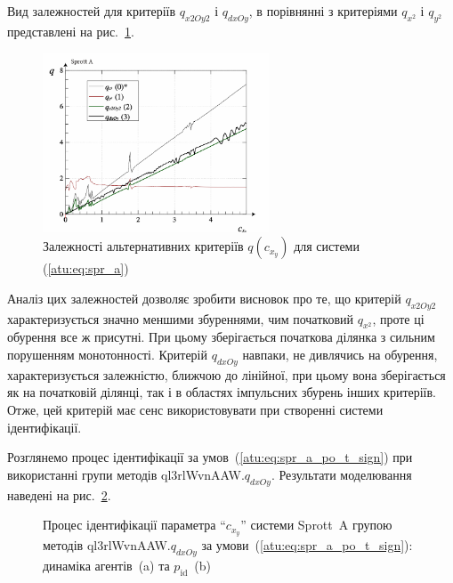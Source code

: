 Вид залежностей для критеріїв
$q_{x2Oy2}$ і
$q_{dxOy}$, в порівнянні з критеріями
$q_{x^2}$ і
$q_{y^2}$ представлені на рис.~\ref{atu:f:spr_a_q_alt}.

\begin{figure}[htb!]
\begin{center}
  \includegraphics[width=0.60\textwidth]{p/cha/spr_a/sprott_a_q2-p_c_x_y2.png}
\end{center}
\caption{Залежності альтернативних критеріїв $q (c_{x_y})$ для системи (\ref{atu:eq:spr_a})}
\label{atu:f:spr_a_q_alt}
\end{figure}

Аналіз цих залежностей дозволяє зробити висновок про те, що
критерій
$q_{x2Oy2}$ характеризується значно меншими збуреннями, чим
початковий
$q_{x^2}$, проте ці обурення все ж присутні. При цьому зберігається
початкова ділянка з сильним порушенням монотонності. Критерій
$q_{dxOy}$ навпаки, не дивлячись на обурення, характеризується
залежністю, ближчою до лінійної, при цьому вона зберігається
як на початковій ділянці, так і в областях імпульсних збурень
інших критеріїв. Отже, цей критерій має сенс використовувати
при створенні системи ідентифікації.

Розглянемо процес ідентифікації за умов~(\ref{atu:eq:spr_a_po_t_sign}) при
використанні групи методів ql3rlWvnAAW.$q_{dxOy}$. Результати моделювання наведені на
рис.~\ref{atu:f:spr_a_id_ql3rlWvnAAW_q_dxOy_sign}.

\begin{figure}[htb!]
  \caption{Процес ідентифікації параметра ``$c_{x_y}$'' системи Sprott~A групою методів ql3rlWvnAAW.$q_{dxOy}$ за умови~(\ref{atu:eq:spr_a_po_t_sign}): динаміка агентів~(a) та $p_\mathrm{id}$~(b)}
  \label{atu:f:spr_a_id_ql3rlWvnAAW_q_dxOy_sign}
\end{figure}

